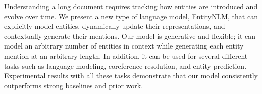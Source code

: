 Understanding a long document requires tracking how entities are introduced and evolve over time. We present a new type of language model, EntityNLM, that can explicitly model entities, dynamically update their representations, and contextually generate their mentions. Our model is generative and flexible; it can model an arbitrary number of entities in context while generating each entity mention at an arbitrary length. In addition, it can be used for several different tasks such as language modeling, coreference resolution, and entity prediction. Experimental results with all these tasks demonstrate that our model consistently outperforms strong baselines and prior work.
